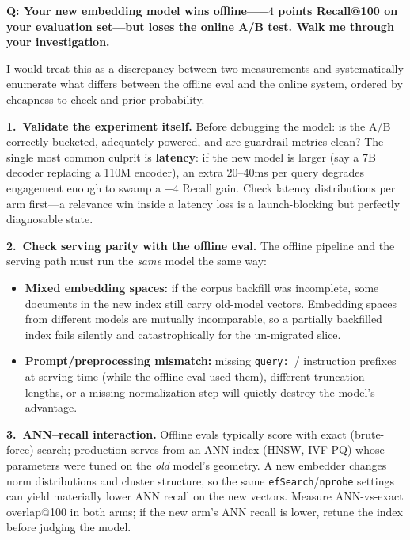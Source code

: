 \vspace{0.5em}

\begin{interviewq}
\textbf{Q: Your new embedding model wins offline---$+4$ points Recall@100 on
your evaluation set---but loses the online A/B test.  Walk me through your
investigation.}

 \quad {} \quad \badgefreq{\freqhigh}

\stronganswer
I would treat this as a discrepancy between two measurements and
systematically enumerate what differs between the offline eval and the
online system, ordered by cheapness to check and prior probability.

\textbf{1.\ Validate the experiment itself.}  Before debugging the model:
is the A/B correctly bucketed, adequately powered, and are guardrail
metrics clean?  The single most common culprit is \textbf{latency}: if the
new model is larger (say a 7B decoder replacing a 110M encoder), an extra
20--40ms per query degrades engagement enough to swamp a $+4$ Recall gain.
Check latency distributions per arm first---a relevance win inside a
latency loss is a launch-blocking but perfectly diagnosable state.

\textbf{2.\ Check serving parity with the offline eval.}  The offline
pipeline and the serving path must run the \emph{same} model the same way:
\begin{itemize}
    \item \textbf{Mixed embedding spaces:} if the corpus backfill was
    incomplete, some documents in the new index still carry old-model
    vectors.  Embedding spaces from different models are mutually
    incomparable, so a partially backfilled index fails silently and
    catastrophically for the un-migrated slice.
    \item \textbf{Prompt/preprocessing mismatch:} missing
    \texttt{query:}~/ instruction prefixes at serving time (while the
    offline eval used them), different truncation lengths, or a missing
    normalization step will quietly destroy the model's advantage.
\end{itemize}

\textbf{3.\ ANN--recall interaction.}  Offline evals typically score with
exact (brute-force) search; production serves from an ANN index (HNSW,
IVF-PQ) whose parameters were tuned on the \emph{old} model's geometry.
A new embedder changes norm distributions and cluster structure, so the
same \texttt{efSearch}/\texttt{nprobe} settings can yield materially lower
ANN recall on the new vectors.  Measure ANN-vs-exact overlap@100 in both
arms; if the new arm's ANN recall is lower, retune the index before judging
the model.


\end{interviewq}
